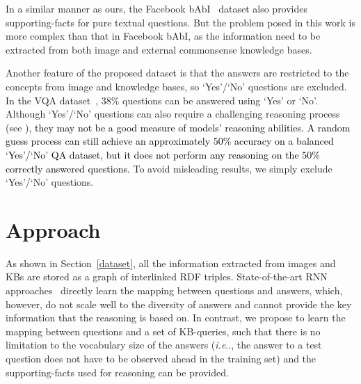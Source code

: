 \documentclass[10pt,journal]{IEEEtran}
\makeatletter
\DeclareRobustCommand\onedot{\futurelet\@let@token\@onedot}
\def\@onedot{\ifx\@let@token.\else.\null\fi\xspace}
\def\ie{\emph{i.e}\onedot} \def\Ie{\emph{I.e}\onedot}
\def\bluett{}
\def\bluettt{\textcolor{black}}
\makeatother
\begin{document}
{In a similar manner as ours, the Facebook bAbI~\cite{weston2015towards} dataset also provides supporting-facts for pure textual questions.
But the problem posed in this work is more complex than that in Facebook bAbI, as the information need to be extracted from both image and external commonsense knowledge bases.

\bluett{Another feature of the proposed dataset is that the answers are restricted to the concepts from image and knowledge bases,
so `Yes'/`No' questions are excluded.
In the VQA dataset~\cite{antol2015vqa}, $38\%$ questions can be answered using `Yes' or `No'.
Although `Yes'/`No' questions can also require a challenging reasoning process (see \cite{andreas2015deep,johnson2016clevr}), 
{\bluettt{they may not be a good measure of models' reasoning abilities.
A random guess process can still achieve an approximately $50\%$ accuracy on a balanced `Yes'/`No' QA dataset, but it does not perform any reasoning on the $50\%$ correctly answered questions.}}
To avoid misleading results, we simply exclude `Yes'/`No' questions.}









\section{Approach}
\label{method}
As shown in Section~\ref{dataset}, all the information extracted from images and KBs are stored as a graph of interlinked RDF triples.
State-of-the-art RNN approaches~\cite{gao2015you,malinowski2015ask,zhu2015visual7w,Chen2015ABC,Jiang2015compositional,andreas2015deep,yang2015stacked} directly learn the mapping between questions and answers,
which, however, do not scale well to the diversity of answers and cannot provide the key information that the reasoning is based on.
In contrast, we propose to learn the mapping between questions and a set of KB-queries,
such that there is no limitation to the vocabulary size of the answers (\ie, the answer to a test question does not have to be observed ahead in the training set)
and the supporting-facts used for reasoning can be provided.






}
\end{document}
